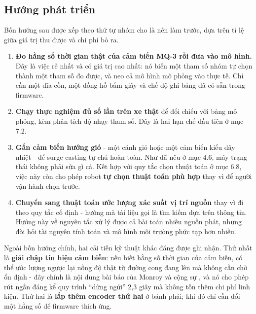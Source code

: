 \subsection{Hướng phát triển}
Bốn hướng sau được xếp theo thứ tự nhóm cho là nên làm trước, dựa trên tỉ lệ giữa giá trị thu được và chi phí bỏ ra.

\begin{enumerate}[leftmargin=1.6em,itemsep=0.15em,topsep=0.3em]
  \item \textbf{Đo hằng số thời gian thật của cảm biến MQ-3 rồi đưa vào mô hình.} Đây là việc rẻ nhất và có giá trị cao nhất: nó biến một tham số nhóm tự chọn thành một tham số đo được, và neo cả mô hình mô phỏng vào thực tế. Chỉ cần một đĩa cồn, một đồng hồ bấm giây và chế độ ghi bảng đã có sẵn trong firmware.
  \item \textbf{Chạy thực nghiệm đủ số lần trên xe thật} để đối chiếu với bảng mô phỏng, kèm phân tích độ nhạy tham số. Đây là hai hạn chế đầu tiên ở mục 7.2.
  \item \textbf{Gắn cảm biến hướng gió} - một cánh gió hoặc một cảm biến kiểu dây nhiệt - để surge-casting tự chủ hoàn toàn. Như đã nêu ở mục 4.6, máy trạng thái không phải sửa gì cả. Kết hợp với quy tắc chọn thuật toán ở mục 6.8, việc này còn cho phép robot \textbf{tự chọn thuật toán phù hợp} thay vì để người vận hành chọn trước.
  \item \textbf{Chuyển sang thuật toán ước lượng xác suất vị trí nguồn} thay vì đi theo quy tắc cố định - hướng mà tài liệu gọi là tìm kiếm dựa trên thông tin. Hướng này về nguyên tắc xử lý được cả bài toán nhiều nguồn phát, nhưng đòi hỏi tài nguyên tính toán và mô hình môi trường phức tạp hơn nhiều.
\end{enumerate}
Ngoài bốn hướng chính, hai cải tiến kỹ thuật khác đáng được ghi nhận. Thứ nhất là \textbf{giải chập tín hiệu cảm biến}: nếu biết hằng số thời gian của cảm biến, có thể ước lượng ngược lại nồng độ thật từ đường cong đang lên mà không cần chờ ổn định - đây chính là nội dung bài báo của Monroy và cộng sự \cite{r3}, và nó cho phép rút ngắn đáng kể quy trình ``dừng ngửi'' 2,3 giây mà không tốn thêm chi phí linh kiện. Thứ hai là \textbf{lắp thêm encoder thứ hai} ở bánh phải; khi đó chỉ cần đổi một hằng số để firmware thích ứng.
